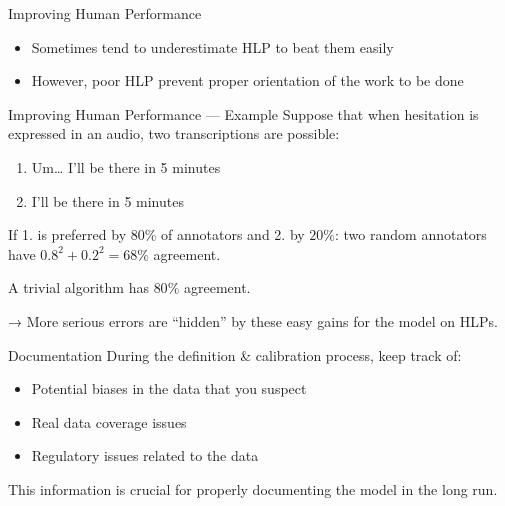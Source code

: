 \begin{frame}{Improving Human Performance}
  \begin{itemize}
    \item Sometimes tend to underestimate HLP to beat them easily
    \item However, poor HLP prevent proper orientation of the work to be done
  \end{itemize}
\end{frame}

\begin{frame}{Improving Human Performance — Example}
  Suppose that when hesitation is expressed in an audio, two transcriptions are possible:
  \begin{enumerate}
    \item Um… I'll be there in 5 minutes
    \item I'll be there in 5 minutes
  \end{enumerate}
  If 1. is preferred by $80\%$ of annotators and 2. by $20\%$: two random annotators have $0.8^2 + 0.2^2 = 68\%$ agreement.

  A trivial algorithm has $80\%$ agreement.

  → More serious errors are “hidden” by these easy gains for the model on HLPs.
\end{frame}

\begin{frame}{Documentation}
  During the definition \& calibration process, keep track of:
  \begin{itemize}
    \item Potential biases in the data that you suspect
    \item Real data coverage issues
    \item Regulatory issues related to the data
  \end{itemize}

  This information is crucial for properly documenting the model in the long run.
\end{frame}

